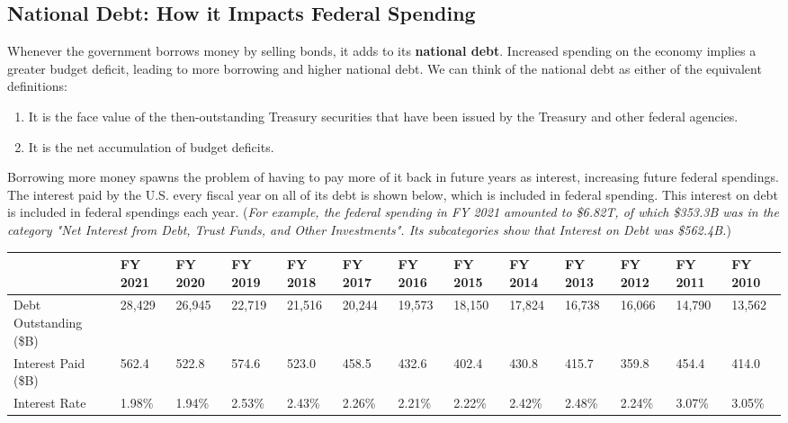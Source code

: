 \documentclass{article}
\begin{document}
  \subsection{National Debt: How it Impacts Federal Spending}

    Whenever the government borrows money by selling bonds, it adds to its \textbf{national debt}. Increased spending on the economy implies a greater budget deficit, leading to more borrowing and higher national debt. We can think of the national debt as either of the equivalent definitions:
    \begin{enumerate}
      \item It is the face value of the then-outstanding Treasury securities that have been issued by the Treasury and other federal agencies.
      \item It is the net accumulation of budget deficits.
    \end{enumerate}

    Borrowing more money spawns the problem of having to pay more of it back in future years as interest, increasing future federal spendings. The interest paid by the U.S. every fiscal year on all of its debt is shown below, which is included in federal spending. This interest on debt is included in federal spendings each year. (\textit{For example, the federal spending in FY 2021 amounted to \$6.82T, of which \$353.3B was in the category "Net Interest from Debt, Trust Funds, and Other Investments". Its subcategories show that Interest on Debt was \$562.4B.})

    \begin{table}[h]
      \begin{tabular}{|l|l|l|l|l|l|l|l|l|l|l|l|l|}
      \hline
      & FY 2021 & FY 2020 & FY 2019 & FY 2018 & FY 2017 & FY 2016 & FY 2015 & FY 2014 & FY 2013 & FY 2012 & FY 2011 & FY 2010 \\ \hline
      Debt Outstanding (\$B) & 28,429 & 26,945 & 22,719 & 21,516 & 20,244 & 19,573 & 18,150 & 17,824 & 16,738 & 16,066 & 14,790 & 13,562 \\ \hline
      Interest Paid (\$B) & 562.4 & 522.8 & 574.6 & 523.0 & 458.5 & 432.6 & 402.4 & 430.8 & 415.7 & 359.8 & 454.4 & 414.0 \\ \hline
      Interest Rate & 1.98\% & 1.94\% & 2.53\% & 2.43\% & 2.26\% & 2.21\% & 2.22\% & 2.42\% & 2.48\% & 2.24\% & 3.07\% & 3.05\% \\ \hline
      \end{tabular}
    \end{table}
\end{document}
